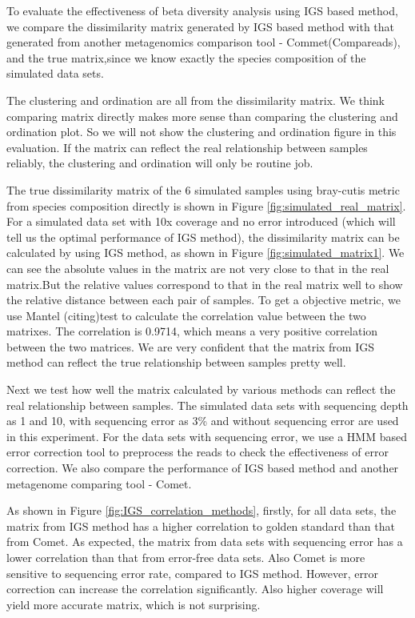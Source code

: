 To evaluate the effectiveness of beta diversity analysis using IGS based method, we compare the dissimilarity matrix generated by IGS based method with that generated from another metagenomics comparison tool - Commet(Compareads), and the true matrix,since we know exactly the species composition of the simulated data sets.

The clustering and ordination are all from the dissimilarity matrix. We think comparing matrix directly makes more sense than comparing the clustering and ordination plot. So we will not show the clustering and ordination figure in this evaluation. If the matrix can reflect the real relationship between samples reliably, the clustering and ordination will only be routine job.

The true dissimilarity matrix of the 6 simulated samples using bray-cutis metric from species composition directly is shown in Figure \ref{fig:simulated_real_matrix}.
For a simulated data set with 10x coverage and no error introduced (which will tell us the optimal performance of IGS method), the dissimilarity matrix can be calculated by using IGS method, as shown in Figure \ref{fig:simulated_matrix1}. We can see the absolute values in the matrix are not very close to that in the real matrix.But the relative values correspond to that in the real matrix well to show the relative distance between each pair of samples. To get a objective metric, we use 
Mantel (citing)test to calculate the correlation value between the two matrixes. The correlation is 0.9714, which means a very positive correlation between the two matrices. We are very confident that the matrix from IGS method can reflect the true relationship between samples pretty well.

Next we test how well the matrix calculated by various methods can reflect the real relationship between samples. 
The simulated data sets with sequencing depth as 1 and 10, with sequencing error as 3\% and without sequencing error are used in this experiment.
For the data sets with sequencing error, we use a HMM based error correction tool to preprocess the reads to check the effectiveness 
of error correction. We also  compare the performance of IGS based method and another metagenome comparing tool - Comet. 

As shown in Figure \ref{fig:IGS_correlation_methods}, firstly, for all data sets, the matrix from IGS method has a higher 
correlation to golden standard than that from Comet.  As expected, the matrix from data sets with sequencing error has a lower correlation than that from error-free
data sets. Also Comet is more sensitive to sequencing error rate, compared to IGS method.
However, error correction can increase the correlation significantly. Also higher coverage will yield more accurate matrix, which is not surprising.

